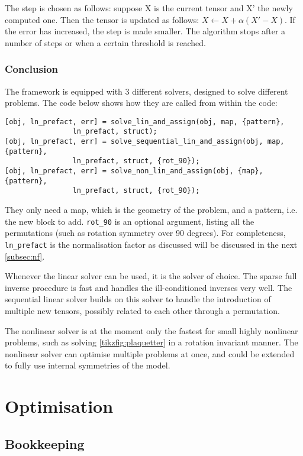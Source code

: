 The step is chosen as follows: suppose X is the current tensor and X' the newly computed one. Then the tensor is updated as follows: $X \leftarrow X + \alpha (X'-X)$. If the error has increased, the step is made smaller. The algorithm stops after a number of steps or when a certain threshold is reached.

\subsubsection{Conclusion}

The framework is equipped with 3 different solvers, designed to solve different problems. The code below shows how they are called from within the code:
\begin{verbatim}
[obj, ln_prefact, err] = solve_lin_and_assign(obj, map, {pattern}, 
                ln_prefact, struct);
[obj, ln_prefact, err] = solve_sequential_lin_and_assign(obj, map, {pattern},
                ln_prefact, struct, {rot_90});
[obj, ln_prefact, err] = solve_non_lin_and_assign(obj, {map}, {pattern}, 
                ln_prefact, struct, {rot_90});
\end{verbatim}
They only need a map, which is the geometry of the problem, and a pattern, i.e. the new block to add. \verb#rot_90# is an optional argument, listing all the permutations (such as rotation symmetry over 90 degrees). For completeness, \verb#ln_prefact# is the normalisation factor as discussed will be discussed in the next \cref{subsec:nf}.

Whenever the linear solver can be used, it is the solver of choice. The sparse full inverse procedure is fast and handles the ill-conditioned inverses very well. The sequential linear solver builds on this solver to handle the introduction of multiple new tensors, possibly related to each other through a permutation.

The nonlinear solver is at the moment only the fastest for small highly nonlinear problems, such as solving \cref{tikzfig:plaquetter} in a rotation invariant manner. The nonlinear solver can optimise multiple problems at once, and could be extended to fully use internal symmetries of the model.

\section{Optimisation}

\subsection{Bookkeeping}

